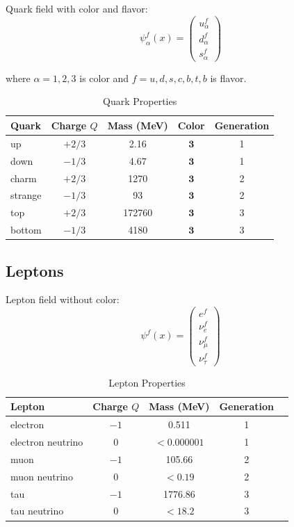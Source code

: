 \begin{definition}
\label{fa_20:def:quark}
Quark field with color and flavor:
\begin{equation}
\psi_{\alpha}^f(x) = \begin{pmatrix}u_\alpha^f \\ d_\alpha^f \\ s_\alpha^f\end{pmatrix}
\end{equation}

where $\alpha = 1,2,3$ is color and $f = u,d,s,c,b,t,b$ is flavor.
\end{definition}

\begin{table}[h]
\centering
\caption{Quark Properties}
\begin{tabular}{lcccc}
\toprule
Quark & Charge $Q$ & Mass (MeV) & Color & Generation \\
\midrule
up & $+2/3$ & 2.16 & $\mathbf{3}$ & 1 \\
down & $-1/3$ & 4.67 & $\mathbf{3}$ & 1 \\
charm & $+2/3$ & 1270 & $\mathbf{3}$ & 2 \\
strange & $-1/3$ & 93 & $\mathbf{3}$ & 2 \\
top & $+2/3$ & 172760 & $\mathbf{3}$ & 3 \\
bottom & $-1/3$ & 4180 & $\mathbf{3}$ & 3 \\
\bottomrule
\end{tabular}
\end{table}

\subsection{Leptons}

\begin{definition}
\label{fa_20:def:lepton}
Lepton field without color:
\begin{equation}
\psi^f(x) = \begin{pmatrix}e^f \\ \nu_e^f \\ \nu_\mu^f \\ \nu_\tau^f\end{pmatrix}
\end{equation}
\end{definition}

\begin{table}[h]
\centering
\caption{Lepton Properties}
\begin{tabular}{lcccc}
\toprule
Lepton & Charge $Q$ & Mass (MeV) & Generation \\
\midrule
electron & $-1$ & 0.511 & 1 \\
electron neutrino & $0$ & $<0.000001$ & 1 \\
muon & $-1$ & 105.66 & 2 \\
muon neutrino & $0$ & $<0.19$ & 2 \\
tau & $-1$ & 1776.86 & 3 \\
tau neutrino & $0$ & $<18.2$ & 3 \\
\bottomrule
\end{tabular}
\end{table}

